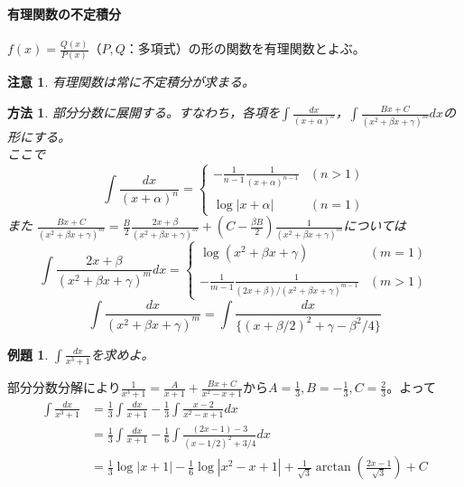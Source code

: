 \documentclass[dvipdfmx,a4j,10pt]{jsarticle}
\makeatletter
\theoremstyle{mystyle1}
\newtheorem{ex}[dfn]{例題}
\theoremstyle{mystyle2}
\newtheorem{ans}{解答}
\newtheorem{note}{注意}
\newtheorem{way*}{方法}
\renewenvironment{ans}[1][解答]{\par
  \pushQED{\qed}%
  \normalfont
  \topsep6\p@\@plus6\p@ \trivlist
  \item[\hskip\labelsep{\bfseries\sffamily #1}]\ignorespaces
}{%
  \popQED\endtrivlist\@endpefalse
}
\makeatother
\begin{document}
\newpage

\paragraph{有理関数の不定積分}

$\displaystyle f(x)=\frac{Q(x)}{P(x)}$（$P,Q$：多項式）の形の関数を有理関数とよぶ。

\begin{note}
有理関数は常に不定積分が求まる。
\end{note}

\begin{way*}
    部分分数に展開する。すなわち，各項を$\displaystyle\int\frac{dx}{(x+\alpha)^n}$，$\displaystyle\int\frac{Bx+C}{(x^2+\beta x+\gamma)^m}dx$の形にする。\\
    ここで
    \[
    \int\frac{dx}{(x+\alpha)^n}=
    \begin{cases}
    \displaystyle-\frac{1}{n-1}\frac{1}{(x+\alpha)^{n-1}} & (n>1)\\
    \\
    \log{|x+\alpha|} & (n=1)
    \end{cases}
    \]
    また
    $\displaystyle\frac{Bx+C}{(x^2+\beta x+\gamma)^m}=\frac{B}{2}\frac{2x+\beta}{(x^2+\beta x+\gamma)^m}+\left(C-\frac{\beta B}{2}\right)\frac{1}{(x^2+\beta x+\gamma)^m}$については
    \[
    \int \frac{2x+\beta}{(x^2+\beta x+\gamma)^m}dx =
    \begin{cases}
    \displaystyle\log{(x^2+\beta x+\gamma)} & (m=1)\\
    \\
    \displaystyle-\frac{1}{m-1}\frac{1}{(2x+\beta)/(x^2+\beta x+\gamma)^{m-1}} & (m>1)
    \end{cases}
    \]
    \[
    \int\frac{dx}{(x^2+\beta x+\gamma)^m}=\int\frac{dx}{\{(x+\beta/2)^2+\gamma-\beta^2/4\}}
    \]
\end{way*}

\begin{shaded}
\begin{ex}\label{ex9.4}
$\displaystyle\int\frac{dx}{x^3+1}$を求めよ。
\end{ex}
\end{shaded}

\begin{ans}[解答\ref{ex9.4}]
部分分数分解により$\displaystyle\frac{1}{x^3+1}=\frac{A}{x+1}+\frac{Bx+C}{x^2-x+1}$から$\displaystyle A=\frac{1}{3},B=-\frac{1}{3},C=\frac{2}{3}$。よって
\[
\begin{split}
\int\frac{dx}{x^3+1}&=\frac{1}{3}\int\frac{dx}{x+1}-\frac{1}{3}\int\frac{x-2}{x^2-x+1}dx\\
&=\frac{1}{3}\int\frac{dx}{x+1}-\frac{1}{6}\int\frac{(2x-1)-3}{(x-1/2)^2+3/4}dx\\
&=\frac{1}{3}\log{|x+1|}-\frac{1}{6}\log{|x^2-x+1|}+\frac{1}{\sqrt{3}}\arctan{\left(\frac{2x-1}{\sqrt{3}}\right)}+C
\end{split}
\]
\end{ans}
\end{document}

